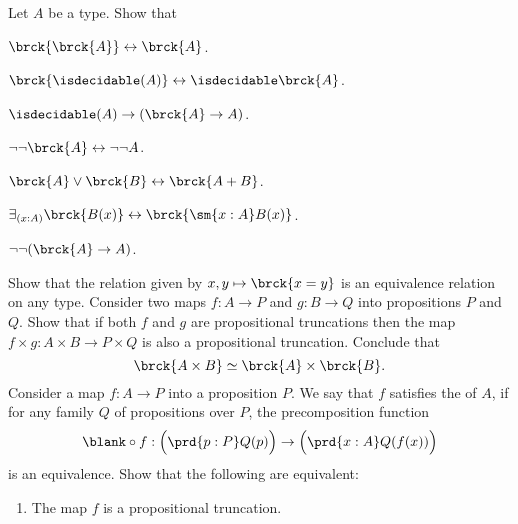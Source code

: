 \begin{exercises}
  \exitem \label{ex:propositional-truncations-drill}Let $A$ be a type. Show that
  \begin{subexenum}
  \item $\brck{\brck{A}}\leftrightarrow\brck{A}$.
  \item $\brck{\isdecidable(A)}\leftrightarrow\isdecidable\brck{A}$.
  \item $\isdecidable(A)\to (\brck{A}\to A)$.
  \item $\neg\neg\brck{A}\leftrightarrow\neg\neg A$.
  \item $\brck{A}\vee\brck{B}\leftrightarrow \brck{A+B}$.
  \item $\exists_{(x:A)}\brck{B(x)}\leftrightarrow \brck{\sm{x:A}B(x)}$.
  \item $\neg\neg(\brck{A}\to A)$.
  \end{subexenum}
  \exitem Show that the  relation given by $x,y\mapsto\brck{x=y}$ is an equivalence relation on any type.
  \exitem \label{ex:product-propositional-truncation}Consider two maps $f:A\to P$ and $g:B\to Q$ into propositions $P$ and $Q$. Show that if both $f$ and $g$ are propositional truncations then the map $f\times g : A\times B\to P\times Q$ is also a propositional truncation. Conclude that
  \begin{equation*}
    \brck{A\times B}\simeq \brck{A}\times\brck{B}. 
  \end{equation*}
  \exitem \label{ex:dup-trunc-prop}Consider a map $f:A\to P$ into a proposition $P$. We say that $f$ satisfies the  of $A$, if for any family $Q$ of propositions over $P$, the precomposition function
  \begin{equation*}
    \blank\circ f : \Big(\prd{p:P}Q(p)\Big)\to\Big(\prd{x:A}Q(f(x))\Big)
  \end{equation*}
  is an equivalence. Show that the following are equivalent:
  \begin{enumerate}
  \item\label{item:up-dup-trunc-Prop} The map $f$ is a propositional truncation.

\end{enumerate}
\end{exercises}
